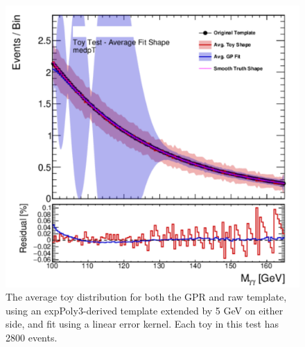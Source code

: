 \begin{figure} 
\begin{center}
  \includegraphics[width=\textwidth]{figures/background/gpr/validation/linear/ToyTest_AvgFitShape_medpT_2800_noSig}   
\caption{The average toy distribution for both the GPR and raw template, using an expPoly3-derived template extended by 5 GeV on either side, and fit using a linear error kernel. Each toy in this test has 2800 events.}
\label{fig:linearkernel_medpt_2800_noSig}
\end{center}
\end{figure}

